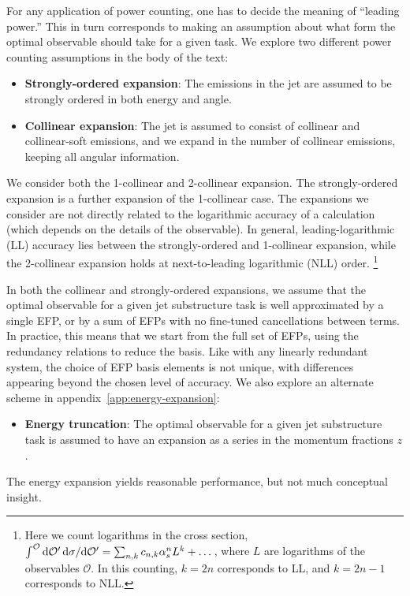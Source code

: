 \documentclass[a4paper,11pt]{article}
\newcommand{\app}[1]{appendix~\ref{app:#1}}
\begin{document}
For any application of power counting, one has to decide the meaning of ``leading power.''
%
This in turn corresponds to making an assumption about what form the optimal observable should take for a given task.
%
We explore two different power counting assumptions in the body of the text: 
%
\begin{itemize}
    \item \textbf{Strongly-ordered expansion}:  The emissions in the jet are assumed to be strongly ordered in both energy and angle. 
    \item \textbf{Collinear expansion}:  The jet is assumed to consist of collinear and collinear-soft emissions, and we expand in the number of collinear emissions, keeping all angular information.  
\end{itemize}
%
 We consider both the 1-collinear and 2-collinear expansion.
 The strongly-ordered expansion is a further expansion of the 1-collinear case. 
 The expansions we consider are not directly related to the logarithmic accuracy of a calculation (which depends on the details of the observable).
 In general, leading-logarithmic (LL) accuracy lies between the strongly-ordered and 1-collinear expansion, while the 2-collinear expansion holds at next-to-leading logarithmic (NLL) order.%
\footnote{\label{footnote:LLdef} Here we count logarithms in the cross section, $\int^{\mathcal{O}} {\rm d} \mathcal{O'}\, {\rm d} \sigma/{\rm d} \mathcal{O'} = \sum_{n,k}c_{n,k} \alpha_s^n L^k + \dots$, where $L$ are logarithms of the observables $\mathcal{O}$. In this counting, $k=2n$ corresponds to LL, and $k=2n-1$ corresponds to NLL.}
%
 
  In both the collinear and strongly-ordered expansions, we assume that the optimal observable for a given jet substructure task is well approximated by a single EFP, or by a sum of EFPs with no fine-tuned cancellations between terms.
  In practice, this means that we start from the full set of EFPs, using the redundancy relations to reduce the basis.
 Like with any linearly redundant system, the choice of EFP basis elements is not unique, with differences appearing beyond the chosen level of accuracy.  
 We also explore an alternate scheme in \app{energy-expansion}:
  \begin{itemize}
    \item \textbf{Energy truncation}:  The optimal observable for a given jet substructure task is assumed to have an expansion as a series in the momentum fractions $z$.
%
\end{itemize}
%
The energy expansion yields reasonable performance, but not much conceptual insight.
 
\end{document}
